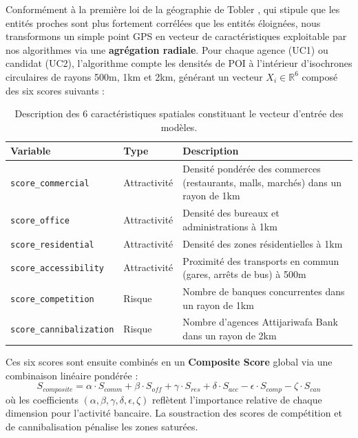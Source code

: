 \documentclass[11pt,a4paper,twoside]{report}
\begin{document}
Conformément à la première loi de la géographie de Tobler \cite{tobler1970}, qui stipule que les entités proches sont plus fortement corrélées que les entités éloignées, nous transformons un simple point GPS en vecteur de caractéristiques exploitable par nos algorithmes via une \textbf{agrégation radiale}. Pour chaque agence (UC1) ou candidat (UC2), l'algorithme compte les densités de POI à l'intérieur d'isochrones circulaires de rayons 500m, 1km et 2km, générant un vecteur $X_i \in \mathbb{R}^6$ composé des six scores suivants :

\begin{table}[h]
\centering
\begin{tabular}{|l|l|p{7cm}|}
\hline
\textbf{Variable} & \textbf{Type} & \textbf{Description} \\ \hline
\texttt{score\_commercial} & Attractivité & Densité pondérée des commerces (restaurants, malls, marchés) dans un rayon de 1km \\ \hline
\texttt{score\_office} & Attractivité & Densité des bureaux et administrations à 1km \\ \hline
\texttt{score\_residential} & Attractivité & Densité des zones résidentielles à 1km \\ \hline
\texttt{score\_accessibility} & Attractivité & Proximité des transports en commun (gares, arrêts de bus) à 500m \\ \hline
\texttt{score\_competition} & Risque & Nombre de banques concurrentes dans un rayon de 1km \\ \hline
\texttt{score\_cannibalization} & Risque & Nombre d'agences Attijariwafa Bank dans un rayon de 2km \\ \hline
\end{tabular}
\caption{Description des 6 caractéristiques spatiales constituant le vecteur d'entrée des modèles.}
\label{tab:features}
\end{table}

Ces six scores sont ensuite combinés en un \textbf{Composite Score} global via une combinaison linéaire pondérée :
\begin{equation}
S_{composite} = \alpha \cdot S_{comm} + \beta \cdot S_{off} + \gamma \cdot S_{res} + \delta \cdot S_{acc} - \epsilon \cdot S_{comp} - \zeta \cdot S_{can}
\label{eq:composite}
\end{equation}
où les coefficients $(\alpha, \beta, \gamma, \delta, \epsilon, \zeta)$ reflètent l'importance relative de chaque dimension pour l'activité bancaire. La soustraction des scores de compétition et de cannibalisation pénalise les zones saturées.
\end{document}
